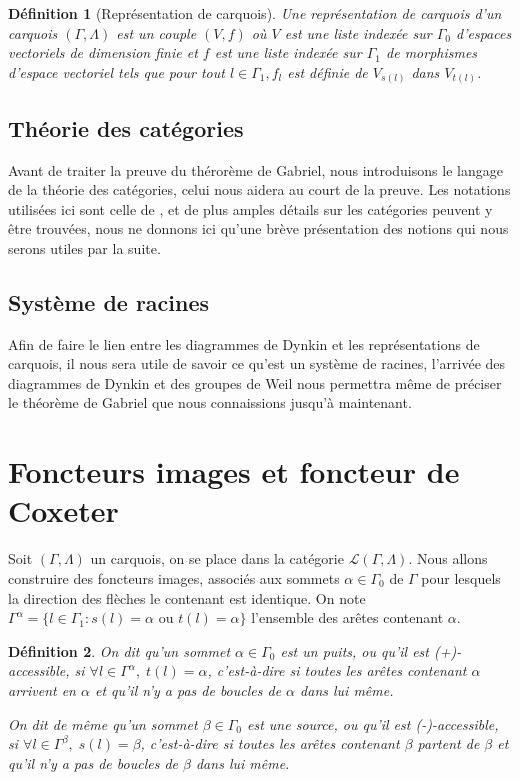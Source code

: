 \documentclass[a4paper,10pt]{article}
\newtheorem{defi}{Définition}[section]
\begin{document}
\begin{defi}[Représentation de carquois]
  Une représentation de carquois d'un carquois $(\Gamma,\Lambda)$ est un couple $(V,f)$ où $V$ est une liste indexée sur $\Gamma_0$ d'espaces vectoriels de dimension finie et $f$ est une liste indexée sur $\Gamma_1$ de morphismes d'espace vectoriel tels que pour tout $l \in \Gamma_1, f_l$ est définie de $V_{s(l)}$ dans $V_{t(l)}$.

\end{defi}

\subsection{Théorie des catégories}
Avant de traiter la preuve du thérorème de Gabriel, nous introduisons le langage de la théorie des catégories, celui nous aidera au court de la preuve. Les notations utilisées ici sont celle de \cite{A97}, et de plus amples détails sur les catégories peuvent y être trouvées, nous ne donnons ici qu'une brève présentation des notions qui nous serons utiles par la suite.

\subsection{Système de racines}
Afin de faire le lien entre les diagrammes de Dynkin et les représentations de carquois, il nous sera utile de savoir ce qu'est un système de racines, l'arrivée des diagrammes de Dynkin et des groupes de Weil nous permettra même de préciser le théorème de Gabriel que nous connaissions jusqu'à maintenant.



\clearpage
\section{Foncteurs images et foncteur de Coxeter}
Soit $(\Gamma,\Lambda)$ un carquois, on se place dans la catégorie $\mathscr{L}(\Gamma,\Lambda)$. Nous allons construire des foncteurs images, associés aux sommets $\alpha \in \Gamma_{0}$ de $\Gamma$ pour lesquels la direction des flèches le contenant est identique. On note $\Gamma^{\alpha}=\{ l\in \Gamma_{1} : s(l)=\alpha\text{ ou }t(l)=\alpha\}$ l'ensemble des arêtes contenant $\alpha$.

\begin{defi}
	On dit qu'un sommet $\alpha \in \Gamma_{0}$ est un puits, ou qu'il est (+)-accessible, si $\forall l \in \Gamma^{\alpha},\; t(l)=\alpha$, c'est-à-dire si toutes les arêtes contenant $\alpha$ arrivent en $\alpha$ et qu'il n'y a pas de boucles de $\alpha$ dans lui même.

On dit de même qu'un sommet $\beta \in \Gamma_{0}$ est une source, ou qu'il est (-)-accessible, si $\forall l \in \Gamma^{\beta},\; s(l)=\beta$, c'est-à-dire si toutes les arêtes contenant $\beta$ partent de $\beta$ et qu'il n'y a pas de boucles de $\beta$ dans lui même.
\end{defi}
\end{document}
